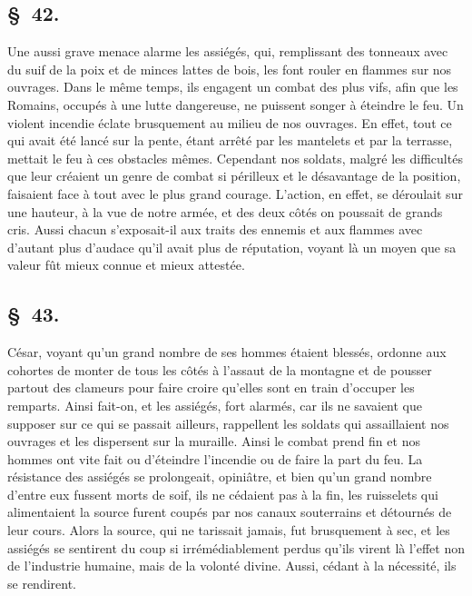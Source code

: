 \documentclass[french,twoside]{book} %
\begin{document}
\subsection[{§ 42.}]{ \textsc{§ 42.} }
\noindent Une aussi grave menace alarme les assiégés, qui, remplissant des tonneaux avec du suif de la poix et de minces lattes de bois, les font rouler en flammes sur nos ouvrages. Dans le même temps, ils engagent un combat des plus vifs, afin que les Romains, occupés à une lutte dangereuse, ne puissent songer à éteindre le feu. Un violent incendie éclate brusquement au milieu de nos ouvrages. En effet, tout ce qui avait été lancé sur la pente, étant arrêté par les mantelets et par la terrasse, mettait le feu à ces obstacles mêmes. Cependant nos soldats, malgré les difficultés que leur créaient un genre de combat si périlleux et le désavantage de la position, faisaient face à tout avec le plus grand courage. L'action, en effet, se déroulait sur une hauteur, à la vue de notre armée, et des deux côtés on poussait de grands cris. Aussi chacun s’exposait-il aux traits des ennemis et aux flammes avec d’autant plus d’audace qu’il avait plus de réputation, voyant là un moyen que sa valeur fût mieux connue et mieux attestée.
\subsection[{§ 43.}]{ \textsc{§ 43.} }
\noindent César, voyant qu’un grand nombre de ses hommes étaient blessés, ordonne aux cohortes de monter de tous les côtés à l’assaut de la montagne et de pousser partout des clameurs pour faire croire qu’elles sont en train d’occuper les remparts. Ainsi fait-on, et les assiégés, fort alarmés, car ils ne savaient que supposer sur ce qui se passait ailleurs, rappellent les soldats qui assaillaient nos ouvrages et les dispersent sur la muraille. Ainsi le combat prend fin et nos hommes ont vite fait ou d’éteindre l’incendie ou de faire la part du feu. La résistance des assiégés se prolongeait, opiniâtre, et bien qu’un grand nombre d’entre eux fussent morts de soif, ils ne cédaient pas à la fin, les ruisselets qui alimentaient la source furent coupés par nos canaux souterrains et détournés de leur cours. Alors la source, qui ne tarissait jamais, fut brusquement à sec, et les assiégés se sentirent du coup si irrémédiablement perdus qu’ils virent là l’effet non de l’industrie humaine, mais de la volonté divine. Aussi, cédant à la nécessité, ils se rendirent.
\end{document}
